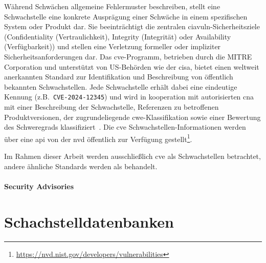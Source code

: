 Während Schwächen allgemeine Fehlermuster beschreiben, stellt eine Schwachstelle eine konkrete Ausprägung einer Schwäche in einem spezifischen System oder Produkt dar.
Sie beeinträchtigt die zentralen \acrshort{ciavuln}-Sicherheitsziele (Confidentiality (Vertraulichkeit), Integrity (Integrität) oder Availability (Verfügbarkeit)) und stellen eine Verletzung formeller oder impliziter Sicherheitsanforderungen dar.
Das \acrshort{cve}-Programm, betrieben durch die MITRE Corporation und unterstützt von US-Behörden wie der \acrfull{cisa}, bietet einen weltweit anerkannten Standard zur Identifikation und Beschreibung von öffentlich bekannten Schwachstellen.
Jede Schwachstelle erhält dabei eine eindeutige Kennung (z.B.\ \verb+CVE-2024-12345+) und wird in kooperation mit autorisierten \acrfull{cna} mit einer Beschreibung der Schwachstelle, Referenzen zu betroffenen Produktversionen, der zugrundeliegende \acrshort{cwe}-Klassifikation sowie einer Bewertung des Schweregrads klassifiziert\ \autocite{Ross_Winstead_McEvilley_2022, CveGlossaryCommonVulnerabilitiesAndExposures12mai2025}.
Die \acrshort{cve} Schwachstellen-Informationen werden über eine \acrshort{api} von der \acrshort{nvd} öffentlich zur Verfügung gestellt\footnote{\url{https://nvd.nist.gov/developers/vulnerabilities}}.

Im Rahmen dieser Arbeit werden ausschließlich \acrshort{cve} als Schwachstellen betrachtet, andere ähnliche Standards werden als  behandelt.


\paragraph{Security Advisories}\label{par:security-advisories}



\section{Schachstelldatenbanken}\label{sec:security-vulnerability-databases}



